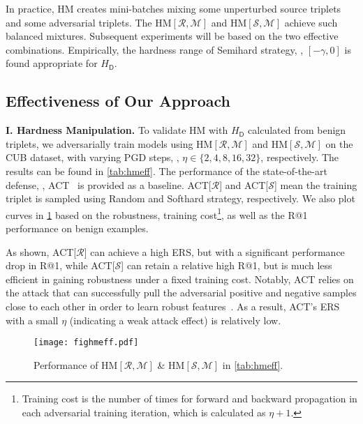 \documentclass[10pt,twocolumn,letterpaper]{article}
\begin{document}

In practice, HM creates mini-batches mixing some unperturbed source triplets and
some adversarial triplets.
%
The $\text{HM}[\mathcal{R}, \mathcal{M}]$ and $\text{HM}[\mathcal{S},
\mathcal{M}]$ achieve such balanced mixtures.
%
Subsequent experiments will be based on the two effective combinations.
%
Empirically, the hardness range of Semihard strategy,
\ie, $[-\gamma,0]$ is found appropriate for $H_\mathsf{D}$.

\subsection{Effectiveness of Our Approach}
\label{sec:42}



\noindent\textbf{I. Hardness Manipulation.}
%
To validate HM with $H_\mathsf{D}$ calculated from benign
triplets, we adversarially train models using $\text{HM}[\mathcal{R},
\mathcal{M}]$ and $\text{HM}[\mathcal{S}, \mathcal{M}]$ on the CUB dataset,
with varying PGD steps, \ie, $\eta\in\{2,4,8,16,32\}$, respectively.
%
The results can be found in \cref{tab:hmeff}.
%
The performance of the state-of-the-art defense, \ie, ACT~\cite{robrank} is
provided as a baseline.
%
ACT[$\mathcal{R}$] and ACT[$\mathcal{S}$] mean the training triplet is sampled
using Random and Softhard strategy, respectively.
%
We also plot curves in \cref{fig:hmeff} based on the robustness, training
cost\footnote{Training cost is the number of times for forward and backward
propagation in each adversarial training iteration, which is calculated as
$\eta+1$.}, as well as the R@1 performance on benign examples.


As shown, ACT[$\mathcal{R}$] can achieve a high ERS, but with a significant
performance drop in R@1, while ACT[$\mathcal{S}$] can retain a relative high
R@1, but is much less efficient in gaining robustness under a fixed training
cost.
%
Notably, ACT relies on the attack that can successfully pull the adversarial
positive and negative samples close to each other in order to learn robust
features~\cite{robrank}.
%
As a result, ACT's ERS with a small $\eta$ (indicating a weak attack effect) is
relatively low.

\begin{figure}[t]
	\texttt{[image: fighmeff.pdf]}
	\vspace{-1.5em}
	\caption{Performance of $\text{HM}[\mathcal{R},\mathcal{M}]$
	\& $\text{HM}[\mathcal{S},\mathcal{M}]$ in \cref{tab:hmeff}.
%
	}
	\label{fig:hmeff}
\end{figure}
\end{document}
